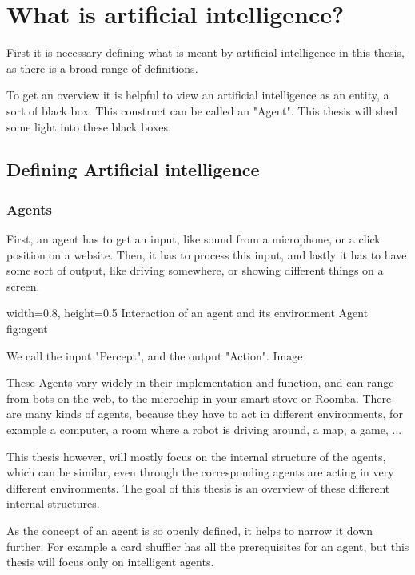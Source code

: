 \chapter{What is artificial intelligence?}
First it is necessary defining what is meant by artificial intelligence in this thesis, as there is a broad range of definitions.%

To get an overview it is helpful to view an artificial intelligence as an entity, a sort of black box. This construct can be called an "Agent". 
This thesis will shed some light into these black boxes.

\section{Defining Artificial intelligence}
\subsection{Agents}
First, an agent has to get an input, like sound from a microphone, or a click position on a website.
Then, it has to process this input, 
and lastly it has to have some sort of output, like driving somewhere, or showing different things on a screen.

    {width=0.8\textwidth, height=0.5\textheight} %
    {Interaction of an agent and its environment}   %
    {Agent}   %
    {fig:agent}    %

We call the input "Percept", and the output "Action". %
Image

These Agents vary widely in their implementation and function, and can range from bots on the web, to the microchip in your smart stove or Roomba. 
There are many kinds of agents, because they have to act in different environments, for example a computer, a room where a robot is driving around, a map, a game, ...

This thesis however, will mostly focus on the internal structure of the agents, which can be similar, even through the corresponding agents are acting in very different environments.
The goal of this thesis is an overview of these different internal structures.

As the concept of an agent is so openly defined, it helps to narrow it down further. For example a card shuffler has all the prerequisites for an agent, but this thesis will focus only on intelligent agents.

